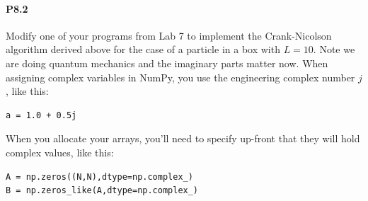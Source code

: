 \documentclass{book}
\theoremstyle{plain}
\theoremstyle{definition}
\numberwithin{exm}{chapter}
\theoremstyle{remark}
\theoremstyle{summary}
\theoremstyle{overview}
\begin{document}
\paragraph*{P8.2}
Modify one of your programs from Lab 7 to implement the Crank-Nicolson algorithm derived above for the case of a particle in a box with $L = 10$. Note we are doing quantum mechanics and the imaginary parts matter now. When assigning complex variables in NumPy, you use the engineering complex number $j$, like this:
\begin{lstlisting}
a = 1.0 + 0.5j
\end{lstlisting}
When you allocate your arrays, you\rq ll need to specify up-front that they will
hold complex values, like this:
\begin{lstlisting}
A = np.zeros((N,N),dtype=np.complex_)
B = np.zeros_like(A,dtype=np.complex_)
\end{lstlisting}
\end{document}
